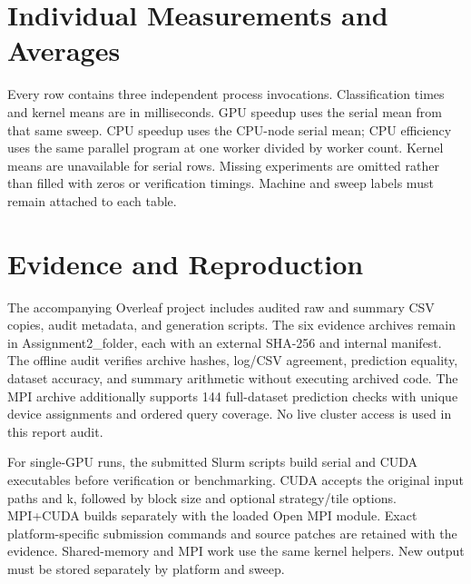 \documentclass[conference]{IEEEtran}
\begin{document}
\clearpage\onecolumn
\appendices
\section{Individual Measurements and Averages}
Every row contains three independent process invocations. Classification times and kernel means are in milliseconds. GPU speedup uses the serial mean from that same sweep. CPU speedup uses the CPU-node serial mean; CPU efficiency uses the same parallel program at one worker divided by worker count. Kernel means are unavailable for serial rows. Missing experiments are omitted rather than filled with zeros or verification timings. Machine and sweep labels must remain attached to each table.

\section{Evidence and Reproduction}
The accompanying Overleaf project includes audited raw and summary CSV copies, audit metadata, and generation scripts. The six evidence archives remain in Assignment2\_folder, each with an external SHA-256 and internal manifest. The offline audit verifies archive hashes, log/CSV agreement, prediction equality, dataset accuracy, and summary arithmetic without executing archived code. The MPI archive additionally supports 144 full-dataset prediction checks with unique device assignments and ordered query coverage. No live cluster access is used in this report audit.

For single-GPU runs, the submitted Slurm scripts build serial and CUDA executables before verification or benchmarking. CUDA accepts the original input paths and k, followed by block size and optional strategy/tile options. MPI+CUDA builds separately with the loaded Open MPI module. Exact platform-specific submission commands and source patches are retained with the evidence. Shared-memory and MPI work use the same kernel helpers. New output must be stored separately by platform and sweep.
\end{document}
